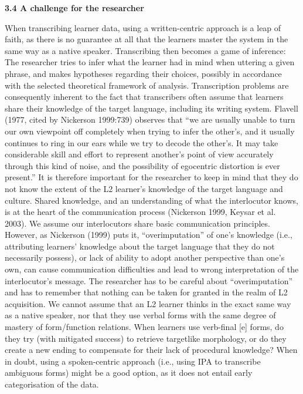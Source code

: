 \documentclass[11pt]{article}
\newenvironment{styleStandard}{\renewcommand\baselinestretch{1.0}\setlength\leftskip{0cm}\setlength\rightskip{0cm plus 1fil}\setlength\parindent{0cm}\setlength\parfillskip{0pt plus 1fil}\setlength\parskip{0in plus 1pt}\writerlistparindent\writerlistleftskip\leavevmode\normalfont\normalsize\writerlistlabel\ignorespaces}{\unskip\vspace{0.111in plus 0.0111in}\par}
\newcommand\writerlistleftskip{}
\newcommand\writerlistparindent{}
\newcommand\writerlistlabel{}
\begin{document}
\begin{styleStandard}
\textbf{3.4 A challenge for the researcher}
\end{styleStandard}

\begin{styleStandard}
When transcribing learner data, using a written-centric approach is a leap of faith, as there is no guarantee at all that the learners master the system in the same way as a native speaker. Transcribing then becomes a game of inference: The researcher tries to infer what the learner had in mind when uttering a given phrase, and makes hypotheses regarding their choices, possibly in accordance with the selected theoretical framework of analysis. Transcription problems are consequently inherent to the fact that transcribers often assume that learners share their knowledge of the target language, including its writing system. Flavell (1977, cited by Nickerson 1999:739) observes that “we are usually unable to turn our own viewpoint off completely when trying to infer the other’s, and it usually continues to ring in our ears while we try to decode the other’s. It may take considerable skill and effort to represent another’s point of view accurately through this kind of noise, and the possibility of egocentric distortion is ever present.” It is therefore important for the researcher to keep in mind that they do not know the extent of the L2 learner’s knowledge of the target language and culture. Shared knowledge, and an understanding of what the interlocutor knows, is at the heart of the communication process (Nickerson 1999, Keysar et al. 2003). We assume our interlocutors share basic communication principles. However, as Nickerson (1999) puts it, “overimputation” of one’s knowledge (i.e., attributing learners’ knowledge about the target language that they do not necessarily possess), or lack of ability to adopt another perspective than one’s own, can cause communication difficulties and lead to wrong interpretation of the interlocutor’s message. The researcher has to be careful about “overimputation” and has to remember that nothing can be taken for granted in the realm of L2 acquisition. We cannot assume that an L2 learner thinks in the exact same way as a native speaker, nor that they use verbal forms with the same degree of mastery of form/function relations. When learners use verb-final [e] forms, do they try (with mitigated success) to retrieve targetlike morphology, or do they create a new ending to compensate for their lack of procedural knowledge? When in doubt, using a spoken-centric approach (i.e., using IPA to transcribe ambiguous forms) might be a good option, as it does not entail early categorisation of the data.
\end{styleStandard}
\end{document}
